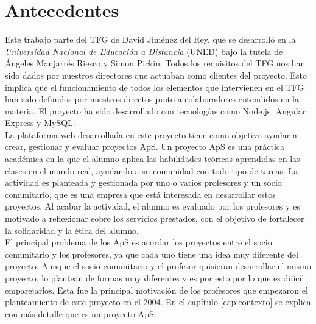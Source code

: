 \documentclass[11pt]{book}
\begin{document}
\section{Antecedentes}
Este trabajo parte del TFG de David Jiménez del Rey, que se desarrolló en la \emph{Universidad Nacional de Educación a Distancia} (UNED) bajo la tutela de Ángeles Manjarrés Riesco y Simon Pickin. Todos los requisitos del TFG nos han sido dados por nuestros directores que actuaban como clientes del proyecto. Esto implica que el funcionamiento de todos los elementos que intervienen en el TFG han sido definidos por nuestros directos junto a colaboradores entendidos en la materia. El proyecto ha sido desarrollado con tecnologías como Node.js, Angular, Express y MySQL.\\
La plataforma web desarrollada en este proyecto tiene como objetivo ayudar a crear, gestionar y evaluar proyectos ApS. Un proyecto ApS es una práctica académica en la que el alumno aplica las habilidades teóricas aprendidas en las clases en el mundo real, ayudando a su comunidad con todo tipo de tareas. La actividad es planteada y gestionada por uno o varios profesores y un socio comunitario, que es una empresa que está interesada en desarrollar estos proyectos. Al acabar la actividad, el alumno es evaluado por los profesores y es motivado a reflexionar sobre los servicios prestados, con el objetivo de fortalecer la solidaridad y la ética del alumno. \\
El principal problema de los ApS es acordar los proyectos entre el socio comunitario y los profesores, ya que cada uno tiene una idea muy diferente del proyecto. Aunque el socio comunitario y el profesor quisieran desarrollar el mismo proyecto, lo plantean de formas muy diferentes y es por esto por lo que es difícil emparejarlos. Esta fue la principal motivación de los profesores que empezaron el planteamiento de este proyecto en el 2004. En el capítulo \ref{cap:contexto} se explica con más detalle que es un proyecto ApS.\\
\end{document}

